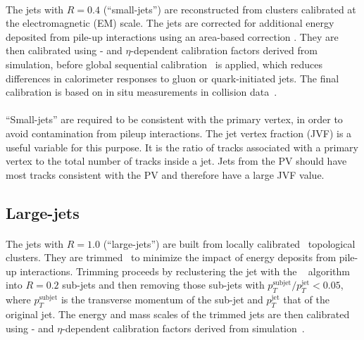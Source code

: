 \paragraph{}
 The jets with $R=0.4$ (``small-\R jets'') are reconstructed from clusters calibrated at the electromagnetic (EM) scale. The jets are corrected for additional energy deposited from pile-up interactions using an area-based correction \cite{Cacciari:2008gn}. 
 They are then calibrated using \pt- and $\eta$-dependent calibration factors derived from simulation, before global sequential calibration~\cite{Aad:2011he} is applied, which reduces differences in calorimeter responses to gluon or quark-initiated jets. 
 The final calibration is based on in situ measurements in collision data~\cite{ATL-PHYS-PUB-2015-015}.

\paragraph{}
``Small-\R jets'' are required to be consistent with the primary vertex, in order to avoid contamination from pileup interactions. The jet vertex fraction (JVF) is a useful variable for this purpose. 
It is the ratio of tracks associated with a primary vertex to the total number of tracks inside a jet. 
Jets from the PV should have most tracks consistent with the PV and therefore have a large JVF value.

\subsection{Large-\R jets}
\paragraph{}
The jets with $R=1.0$ (``large-\R jets'') are built from locally calibrated~\cite{Aad:2011he} topological clusters. They are trimmed~\cite{Krohn2010} to minimize the impact of energy deposits from pile-up interactions. 
Trimming proceeds by reclustering the jet with the \kt~ algorithm~\cite{Ellis:1993tq} into $R = 0.2$ sub-jets and then removing those sub-jets with $p_T^{\mathrm{subjet}}/p_T^{\mathrm{jet}} < 0.05$, where $p_T^{\mathrm{subjet}}$ is the transverse momentum of the sub-jet and $p_T^{\mathrm{jet}}$ that of the original jet. 
The energy and mass scales of the trimmed jets are then calibrated using \pt- and $\eta$-dependent calibration factors derived from simulation~\cite{PERF-2012-02}.

